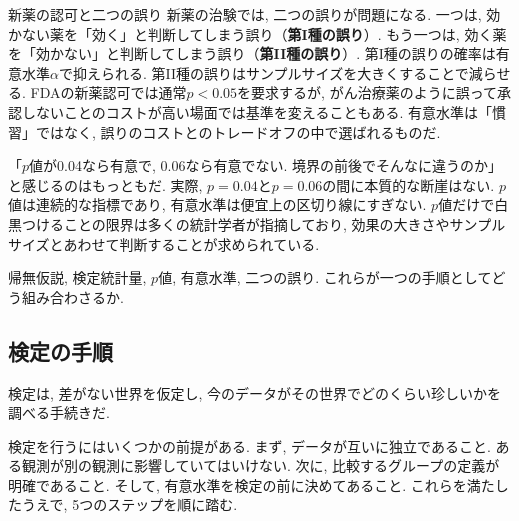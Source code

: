     \begin{mybox}{新薬の認可と二つの誤り}
      新薬の治験では, 二つの誤りが問題になる.
      一つは, 効かない薬を「効く」と判断してしまう誤り（\textbf{第I種の誤り}）.
      もう一つは, 効く薬を「効かない」と判断してしまう誤り（\textbf{第II種の誤り}）.
      第I種の誤りの確率は有意水準$\alpha$で抑えられる.
      第II種の誤りはサンプルサイズを大きくすることで減らせる.
      FDAの新薬認可では通常$p < 0.05$を要求するが,
      がん治療薬のように誤って承認しないことのコストが高い場面では基準を変えることもある.
      有意水準は「慣習」ではなく, 誤りのコストとのトレードオフの中で選ばれるものだ.
    \end{mybox}

    「$p$値が0.04なら有意で, 0.06なら有意でない. 境界の前後でそんなに違うのか」と感じるのはもっともだ.
    実際, $p = 0.04$と$p = 0.06$の間に本質的な断崖はない.
    $p$値は連続的な指標であり, 有意水準は便宜上の区切り線にすぎない.
    $p$値だけで白黒つけることの限界は多くの統計学者が指摘しており,
    効果の大きさやサンプルサイズとあわせて判断することが求められている.

    帰無仮説, 検定統計量, $p$値, 有意水準, 二つの誤り.
    これらが一つの手順としてどう組み合わさるか.


  \subsection{検定の手順}

    検定は, 差がない世界を仮定し, 今のデータがその世界でどのくらい珍しいかを調べる手続きだ.

    検定を行うにはいくつかの前提がある.
    まず, データが互いに独立であること. ある観測が別の観測に影響していてはいけない.
    次に, 比較するグループの定義が明確であること.
    そして, 有意水準を検定の前に決めてあること.
    これらを満たしたうえで, 5つのステップを順に踏む.

